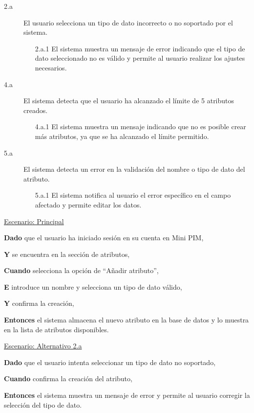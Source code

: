 \begin{description}
    \item[2.a] El usuario selecciona un tipo de dato incorrecto o no soportado por el sistema.
    \begin{enumerate}
        \item[2.a.1] El sistema muestra un mensaje de error indicando que el tipo de dato seleccionado no es válido y permite al usuario realizar los ajustes necesarios.
    \end{enumerate}

    \item[4.a] El sistema detecta que el usuario ha alcanzado el límite de 5 atributos creados.
    \begin{enumerate}
        \item[4.a.1] El sistema muestra un mensaje indicando que no es posible crear más atributos, ya que se ha alcanzado el límite permitido.
    \end{enumerate}

    \item[5.a] El sistema detecta un error en la validación del nombre o tipo de dato del atributo.
    \begin{enumerate}
        \item[5.a.1] El sistema notifica al usuario el error específico en el campo afectado y permite editar los datos.
    \end{enumerate}
\end{description}

\underline{Escenario: Principal}\par
\vspace{0.15cm}
\textbf{Dado} que el usuario ha iniciado sesión en su cuenta en Mini PIM,\par
\textbf{Y} se encuentra en la sección de atributos,\par
\textbf{Cuando} selecciona la opción de \enquote{Añadir atributo},\par
\textbf{E} introduce un nombre y selecciona un tipo de dato válido,\par
\textbf{Y} confirma la creación,\par
\textbf{Entonces} el sistema almacena el nuevo atributo en la base de datos y lo muestra en la lista de atributos disponibles.\par
\vspace{0.20cm}

\underline{Escenario: Alternativo 2.a}\par
\vspace{0.15cm}
\textbf{Dado} que el usuario intenta seleccionar un tipo de dato no soportado,\par
\textbf{Cuando} confirma la creación del atributo,\par
\textbf{Entonces} el sistema muestra un mensaje de error y permite al usuario corregir la selección del tipo de dato.\par
\vspace{0.20cm}

